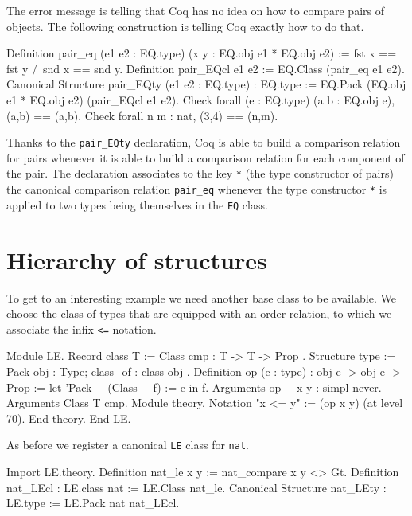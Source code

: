 The error message is telling that Coq has no idea on how to compare
pairs of objects.  The following construction is telling Coq exactly how to do
that.

\begin{coq_example}
Definition pair_eq (e1 e2 : EQ.type) (x y : EQ.obj e1 * EQ.obj e2) :=
  fst x == fst y /\ snd x == snd y.
Definition pair_EQcl e1 e2 := EQ.Class (pair_eq e1 e2).
Canonical Structure pair_EQty (e1 e2 : EQ.type) : EQ.type :=
  EQ.Pack (EQ.obj e1 * EQ.obj e2) (pair_EQcl e1 e2).
Check forall (e : EQ.type) (a b : EQ.obj e), (a,b) == (a,b).
Check forall n m : nat, (3,4) == (n,m).
\end{coq_example}

Thanks to the \texttt{pair\_EQty} declaration, Coq is able to build a comparison
relation for pairs whenever it is able to build a comparison relation
for each component of the pair.  The declaration associates to the key
\texttt{*} (the type constructor of pairs) the canonical comparison relation
\texttt{pair\_eq} whenever the type constructor \texttt{*} is applied to two types
being themselves in the \texttt{EQ} class.

\section{Hierarchy of structures}

To get to an interesting example we need another base class to be available.
We choose the class of types that are equipped with an order relation,
to which we associate the infix \texttt{<=} notation.

\begin{coq_example}
Module LE.
  Record class T := Class { cmp : T -> T -> Prop }.
  Structure type := Pack { obj : Type; class_of : class obj }.
  Definition op (e : type) : obj e -> obj e -> Prop :=
    let 'Pack _ (Class _ f) := e in f.
  Arguments op {_} x y : simpl never.
  Arguments Class {T} cmp.
  Module theory.
  Notation "x <= y" := (op x y) (at level 70).
  End theory.
End LE.
\end{coq_example}

As before we register a canonical \texttt{LE} class for \texttt{nat}.

\begin{coq_example}
Import LE.theory.
Definition nat_le x y := nat_compare x y <> Gt.
Definition nat_LEcl : LE.class nat := LE.Class nat_le.
Canonical Structure nat_LEty : LE.type := LE.Pack nat nat_LEcl.
\end{coq_example}

